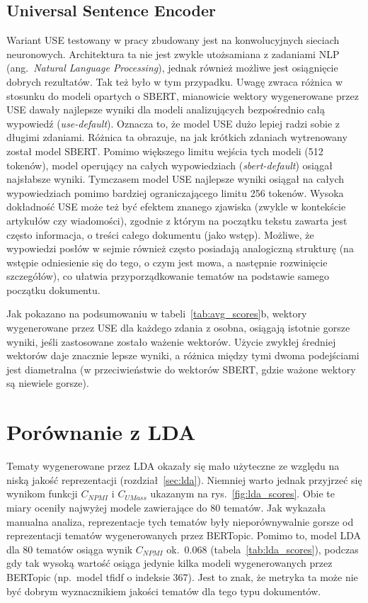 	\subsection{Universal Sentence Encoder}
		Wariant USE testowany w pracy zbudowany jest na konwolucyjnych sieciach neuronowych.
		Architektura ta nie jest zwykle utożsamiana z zadaniami NLP (ang.\ \emph{Natural Language Processing}), jednak również możliwe jest osiągnięcie dobrych rezultatów.
		Tak też było w tym przypadku.
		Uwagę zwraca różnica w stosunku do modeli opartych o SBERT, mianowicie wektory wygenerowane przez USE dawały najlepsze wyniki dla modeli analizujących bezpośrednio całą wypowiedź (\emph{use-default}).
		Oznacza to, że model USE dużo lepiej radzi sobie z długimi zdaniami.
		Różnica ta obrazuje, na jak krótkich zdaniach wytrenowany został model SBERT\@.
		Pomimo większego limitu wejścia tych modeli (512 tokenów), model operujący na całych wypowiedziach (\emph{sbert-default}) osiągał najsłabsze wyniki.
		Tymczasem model USE najlepsze wyniki osiągał na całych wypowiedziach pomimo bardziej ograniczającego limitu 256 tokenów.
		Wysoka dokładność USE może też być efektem znanego zjawiska (zwykle w kontekście artykułów czy wiadomości),
			zgodnie z którym na początku tekstu zawarta jest często informacja, o treści całego dokumentu (jako wstęp).
		Możliwe, że wypowiedzi posłów w sejmie również często posiadają analogiczną strukturę
			(na wstępie odniesienie się do tego, o czym jest mowa, a następnie rozwinięcie szczegółów), co ułatwia przyporządkowanie tematów na podstawie samego początku dokumentu.

		Jak pokazano na podsumowaniu w tabeli~\ref{tab:avg_scores}b, wektory wygenerowane przez USE dla każdego zdania z osobna, osiągają istotnie gorsze wyniki,
			jeśli zastosowane zostało ważenie wektorów.
		Użycie zwykłej średniej wektorów daje znacznie lepsze wyniki, a różnica między tymi dwoma podejściami jest diametralna
			(w przeciwieństwie do wektorów SBERT, gdzie ważone wektory są niewiele gorsze).
	
\section{Porównanie z LDA}
	Tematy wygenerowane przez LDA okazały się mało użyteczne ze względu na niską jakość reprezentacji (rozdział~\ref{sec:lda}).
	Niemniej warto jednak przyjrzeć się wynikom funkcji \(C_{NPMI}\) i \(C_{UMass}\) ukazanym na rys.~\ref{fig:lda_scores}.
	Obie te miary oceniły najwyżej modele zawierające do 80 tematów.
	Jak wykazała manualna analiza, reprezentacje tych tematów były nieporównywalnie gorsze od reprezentacji tematów wygenerowanych przez BERTopic.
	Pomimo to, model LDA dla 80 tematów osiąga wynik \(C_{NPMI}\) ok.~0.068 (tabela~\ref{tab:lda_scores}),
		podczas gdy tak wysoką wartość osiąga jedynie kilka modeli wygenerowanych przez BERTopic (np.~model tfidf o indeksie 367).
	Jest to znak, że metryka ta może nie być dobrym wyznacznikiem jakości tematów dla tego typu dokumentów.


